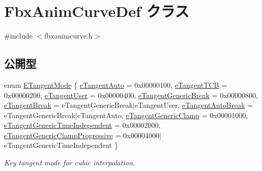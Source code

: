 \hypertarget{class_fbx_anim_curve_def}{}\section{Fbx\+Anim\+Curve\+Def クラス}
\label{class_fbx_anim_curve_def}


{\ttfamily \#include $<$fbxanimcurve.\+h$>$}

\subsection*{公開型}
\begin{DoxyCompactItemize}
\item 
enum \hyperlink{class_fbx_anim_curve_def_ac810ccc5ca0527704ab5175479964b87}{E\+Tangent\+Mode} \{ \newline
\hyperlink{class_fbx_anim_curve_def_ac810ccc5ca0527704ab5175479964b87a56e3bad364851277281e94e81327dd25}{e\+Tangent\+Auto} = 0x00000100, 
\hyperlink{class_fbx_anim_curve_def_ac810ccc5ca0527704ab5175479964b87ae9d885e8a384fd9165123ac47a661dd8}{e\+Tangent\+T\+CB} = 0x00000200, 
\hyperlink{class_fbx_anim_curve_def_ac810ccc5ca0527704ab5175479964b87a199cb16b2c861b12c334093ce796cb86}{e\+Tangent\+User} = 0x00000400, 
\hyperlink{class_fbx_anim_curve_def_ac810ccc5ca0527704ab5175479964b87a423a9e02047b705ec23561f87d8ff15b}{e\+Tangent\+Generic\+Break} = 0x00000800, 
\newline
\hyperlink{class_fbx_anim_curve_def_ac810ccc5ca0527704ab5175479964b87ab4d85a1a0474226be85b885518f6c847}{e\+Tangent\+Break} = e\+Tangent\+Generic\+Break$\vert$e\+Tangent\+User, 
\hyperlink{class_fbx_anim_curve_def_ac810ccc5ca0527704ab5175479964b87afce344e3f0ada1ec522ef67f0a0e92cb}{e\+Tangent\+Auto\+Break} = e\+Tangent\+Generic\+Break$\vert$e\+Tangent\+Auto, 
\hyperlink{class_fbx_anim_curve_def_ac810ccc5ca0527704ab5175479964b87a53bad41061d60bae2373a88e13eeac50}{e\+Tangent\+Generic\+Clamp} = 0x00001000, 
\hyperlink{class_fbx_anim_curve_def_ac810ccc5ca0527704ab5175479964b87abaaae6df50c5a1a651d0e5678c4a90cd}{e\+Tangent\+Generic\+Time\+Independent} = 0x00002000, 
\newline
\hyperlink{class_fbx_anim_curve_def_ac810ccc5ca0527704ab5175479964b87a87eba898c30497b7e94da22822500757}{e\+Tangent\+Generic\+Clamp\+Progressive} = 0x00004000$\vert$e\+Tangent\+Generic\+Time\+Independent
 \}\begin{DoxyCompactList}\small\item\em Key tangent mode for cubic interpolation. \end{DoxyCompactList}

\end{DoxyCompactItemize}
